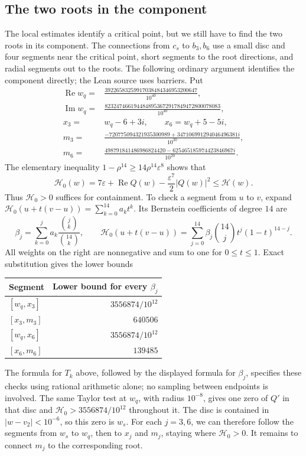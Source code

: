 \documentclass[11pt]{article}
\begin{document}
\subsection{The two roots in the component}\label{subsec:counterexample-connections}

The local estimates identify a critical point, but we still have to
find the two roots in its component. The connections from $c_s$ to
$b_3,b_6$ use a small disc and four segments near the critical point,
short segments to the root directions, and radial segments out to the
roots. The following ordinary argument identifies the component
directly; the Lean source uses barriers. Put
\begin{align*}
 \operatorname{Re}w_q={}&\frac{39226583259917038484346953200647}{10^{40}},\\
 \operatorname{Im}w_q={}&\frac{8232474661944848953672917849472800078083}{10^{40}},\\
 x_3={}&w_q-6+3i,\qquad x_6=w_q+5-5i,\\
 m_3={}&\frac{-720775094321935300989+347106991294046496381i}{10^{20}},\\
 m_6={}&\frac{498791841486986824420-625465185974423846967i}{10^{20}}.
\end{align*}
The elementary inequality
$1-\rho^{14}\ge14\rho^{14}\varepsilon^8$ shows that
\[
 \mathscr H_0(w)=7\varepsilon+\operatorname{Re}Q(w)
                  -\frac{\varepsilon^7}{2}|Q(w)|^2
 \le\mathscr H(w).
\]
Thus $\mathscr H_0>0$ suffices for containment. To check a segment from
$u$ to $v$, expand
$\mathscr H_0(u+t(v-u))=\sum_{k=0}^{14}a_kt^k$. Its Bernstein
coefficients of degree $14$ are
\[
 \beta_j=\sum_{k=0}^j a_k\frac{{j\choose k}}{{14\choose k}},
 \qquad
 \mathscr H_0(u+t(v-u))
   =\sum_{j=0}^{14}\beta_j{14\choose j}t^j(1-t)^{14-j}.
\]
All weights on the right are nonnegative and sum to one for $0\le t\le1$.
Exact substitution gives the lower bounds
\begin{center}
\begin{tabular}{@{}lr@{}}
\toprule
Segment & Lower bound for every $\beta_j$\\
\midrule
$[w_q,x_3]$ & $3556874/10^{12}$\\
$[x_3,m_3]$ & $640506$\\
$[w_q,x_6]$ & $3556874/10^{12}$\\
$[x_6,m_6]$ & $139485$\\
\bottomrule
\end{tabular}
\end{center}
The formula for $T_k$ above, followed by the displayed formula for
$\beta_j$, specifies these checks using rational arithmetic alone; no
sampling between endpoints is involved. The same Taylor test at $w_q$,
with radius $10^{-8}$, gives one zero of $Q'$ in that disc and
$\mathscr H_0>3556874/10^{12}$ throughout it. The disc is contained in
$|w-v_2|<10^{-6}$, so this zero is $w_s$.
For each $j=3,6$, we can therefore follow the segments from $w_s$ to
$w_q$, then to $x_j$ and $m_j$, staying where $\mathscr H_0>0$.
It remains to connect $m_j$ to the corresponding root.
\end{document}
